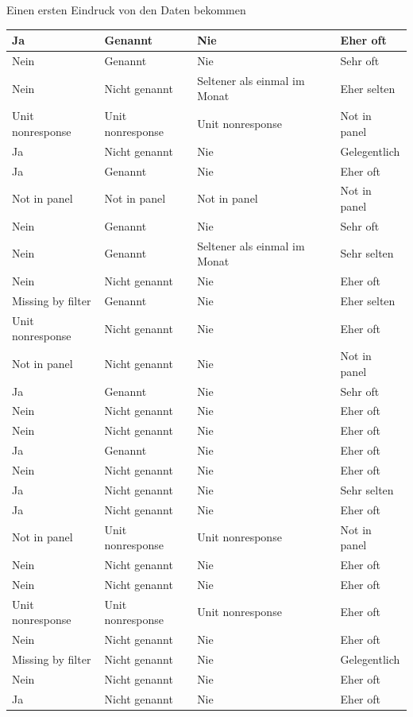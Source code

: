 \documentclass[ignorenonframetext,]{beamer}
\begin{document}
\begin{frame}{Einen ersten Eindruck von den Daten bekommen}
\begin{tabular}{l|l|l|l}
\hline
Ja & Genannt & Nie & Eher oft\\
\hline
Nein & Genannt & Nie & Sehr oft\\
\hline
Nein & Nicht genannt & Seltener als einmal im Monat & Eher selten\\
\hline
Unit nonresponse & Unit nonresponse & Unit nonresponse & Not in panel\\
\hline
Ja & Nicht genannt & Nie & Gelegentlich\\
\hline
Ja & Genannt & Nie & Eher oft\\
\hline
Not in panel & Not in panel & Not in panel & Not in panel\\
\hline
Nein & Genannt & Nie & Sehr oft\\
\hline
Nein & Genannt & Seltener als einmal im Monat & Sehr selten\\
\hline
Nein & Nicht genannt & Nie & Eher oft\\
\hline
Missing by filter & Genannt & Nie & Eher selten\\
\hline
Unit nonresponse & Nicht genannt & Nie & Eher oft\\
\hline
Not in panel & Nicht genannt & Nie & Not in panel\\
\hline
Ja & Genannt & Nie & Sehr oft\\
\hline
Nein & Nicht genannt & Nie & Eher oft\\
\hline
Nein & Nicht genannt & Nie & Eher oft\\
\hline
Ja & Genannt & Nie & Eher oft\\
\hline
Nein & Nicht genannt & Nie & Eher oft\\
\hline
Ja & Nicht genannt & Nie & Sehr selten\\
\hline
Ja & Nicht genannt & Nie & Eher oft\\
\hline
Not in panel & Unit nonresponse & Unit nonresponse & Not in panel\\
\hline
Nein & Nicht genannt & Nie & Eher oft\\
\hline
Nein & Nicht genannt & Nie & Eher oft\\
\hline
Unit nonresponse & Unit nonresponse & Unit nonresponse & Eher oft\\
\hline
Nein & Nicht genannt & Nie & Eher oft\\
\hline
Missing by filter & Nicht genannt & Nie & Gelegentlich\\
\hline
Nein & Nicht genannt & Nie & Eher oft\\
\hline
Ja & Nicht genannt & Nie & Eher oft\\

\end{tabular}
\end{frame}
\end{document}
